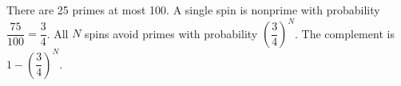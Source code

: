 There are 25 primes at most 100. A single spin is nonprime with probability $\dfrac{75}{100}=\dfrac{3}{4}$. All $N$ spins avoid primes with probability $(\dfrac{3}{4})^N$. The complement is $\boxed{1-(\dfrac{3}{4})^N}$.
